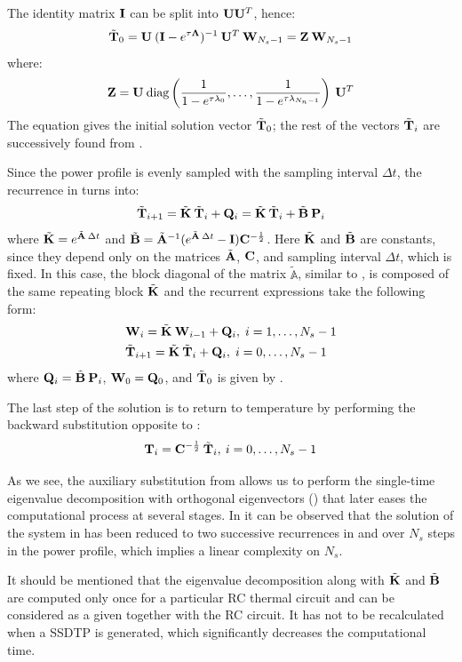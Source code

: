 The identity matrix $\mathbf{I}$ can be split into $\mathbf{U} \mathbf{U}^T$, hence:
\begin{equation} \label{eq:t0}
  \tilde{\mathbf{T}}_0 = \mathbf{U} \: (\mathbf{I} - e^{\tau \mathbf{\Lambda}})^{-1} \: \mathbf{U}^T \: \mathbf{W}_{N_s - 1} = \mathbf{Z} \: \mathbf{W}_{N_s - 1}
\end{equation}
where:
\[
  \mathbf{Z} = \mathbf{U} \: \text{diag} \left( \frac{1}{1 - e^{\tau \lambda_0}}, \dots, \frac{1}{1 - e^{\tau \lambda_{N_n - 1}}} \right) \: \mathbf{U}^T
\]
The equation gives the initial solution vector $\tilde{\mathbf{T}}_0$; the rest of the vectors $\tilde{\mathbf{T}}_i$ are successively found from .

Since the power profile is evenly sampled with the sampling interval $\Delta t$, the recurrence in  turns into:
\[
  \tilde{\mathbf{T}}_{i+1} = \tilde{\mathbf{K}} \: \tilde{\mathbf{T}}_i + \mathbf{Q}_i = \tilde{\mathbf{K}} \: \tilde{\mathbf{T}}_i + \tilde{\mathbf{B}} \: \mathbf{P}_i
\]
where $\tilde{\mathbf{K}} = e^{\tilde{\mathbf{A}} \: \Delta t}$ and $\tilde{\mathbf{B}} = \tilde{\mathbf{A}}^{-1} ( e^{\tilde{\mathbf{A}} \: \Delta t} - \mathbf{I} ) \mathbf{C}^{-\frac{1}{2}}$. Here $\tilde{\mathbf{K}}$ and $\tilde{\mathbf{B}}$ are constants, since they depend only on the matrices $\tilde{\mathbf{A}}$, $\mathbf{C}$, and sampling interval $\Delta t$, which is fixed. In this case, the block diagonal of the matrix $\tilde{\mathbb{A}}$, similar to , is composed of the same repeating block $\tilde{\mathbf{K}}$ and the recurrent expressions take the following form:
\begin{align}
  & \mathbf{W}_i = \tilde{\mathbf{K}} \: \mathbf{W}_{i - 1} + \mathbf{Q}_i, \; i = 1, \dots, N_s - 1 \label{eq:final-p-recurrence} \\
  & \tilde{\mathbf{T}}_{i + 1} = \tilde{\mathbf{K}} \: \tilde{\mathbf{T}}_i + \mathbf{Q}_i, \; i = 0, \dots, N_s - 1 \label{eq:final-y-recurrence}
\end{align}
where $\mathbf{Q}_i = \tilde{\mathbf{B}} \: \mathbf{P}_i$, $\mathbf{W}_0 = \mathbf{Q}_0$, and $\tilde{\mathbf{T}}_0$ is given by .

The last step of the solution is to return to temperature by performing the backward substitution opposite to :
\[
  \mathbf{T}_i = \mathbf{C}^{-\frac{1}{2}} \: \tilde{\mathbf{T}}_i, \: i = 0, \dots, N_s - 1
\]

As we see, the auxiliary substitution from  allows us to perform the single-time eigenvalue decomposition with orthogonal eigenvectors () that later eases the computational process at several stages. In  it can be observed that the solution of the system in  has been reduced to two successive recurrences in  and  over $N_s$ steps in the power profile, which implies a linear complexity on $N_s$.

It should be mentioned that the eigenvalue decomposition along with $\tilde{\mathbf{K}}$ and $\tilde{\mathbf{B}}$ are computed only once for a particular RC thermal circuit and can be considered as a given together with the RC circuit. It has not to be recalculated when a SSDTP is generated, which significantly decreases the computational time.
